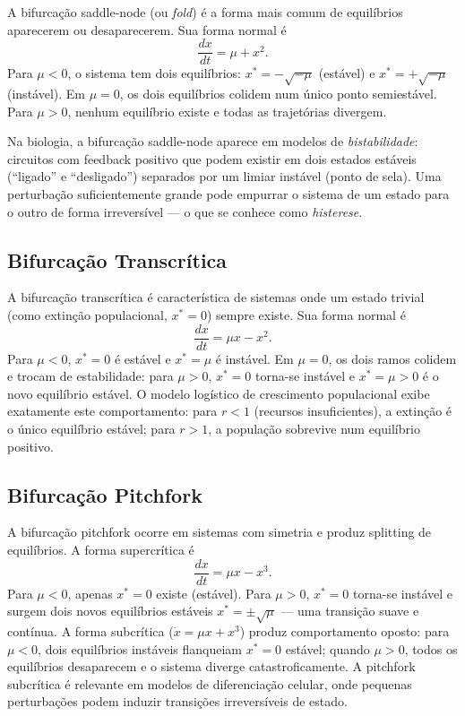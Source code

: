A bifurcação saddle-node (ou \emph{fold}) é a forma mais comum de equilíbrios aparecerem
ou desaparecerem. Sua forma normal é
\begin{equation}
  \frac{dx}{dt} = \mu + x^2.
\end{equation}
Para $\mu < 0$, o sistema tem dois equilíbrios: $x^* = -\sqrt{-\mu}$ (estável) e
$x^* = +\sqrt{-\mu}$ (instável). Em $\mu = 0$, os dois equilíbrios colidem num único ponto
semiestável. Para $\mu > 0$, nenhum equilíbrio existe e todas as trajetórias divergem.

Na biologia, a bifurcação saddle-node aparece em modelos de \emph{bistabilidade}: circuitos
com feedback positivo que podem existir em dois estados estáveis (``ligado'' e ``desligado'')
separados por um limiar instável (ponto de sela). Uma perturbação suficientemente grande
pode empurrar o sistema de um estado para o outro de forma irreversível --- o que se conhece
como \emph{histerese}.

\subsection{Bifurcação Transcrítica}

A bifurcação transcrítica é característica de sistemas onde um estado trivial (como extinção
populacional, $x^* = 0$) sempre existe. Sua forma normal é
\begin{equation}
  \frac{dx}{dt} = \mu x - x^2.
\end{equation}
Para $\mu < 0$, $x^* = 0$ é estável e $x^* = \mu$ é instável. Em $\mu = 0$, os dois
ramos colidem e trocam de estabilidade: para $\mu > 0$, $x^* = 0$ torna-se instável e
$x^* = \mu > 0$ é o novo equilíbrio estável. O modelo logístico de crescimento populacional
exibe exatamente este comportamento: para $r < 1$ (recursos insuficientes), a extinção é o
único equilíbrio estável; para $r > 1$, a população sobrevive num equilíbrio positivo.

\subsection{Bifurcação Pitchfork}

A bifurcação pitchfork ocorre em sistemas com simetria e produz splitting de equilíbrios.
A forma supercrítica é
\begin{equation}
  \frac{dx}{dt} = \mu x - x^3.
\end{equation}
Para $\mu < 0$, apenas $x^* = 0$ existe (estável). Para $\mu > 0$, $x^* = 0$ torna-se
instável e surgem dois novos equilíbrios estáveis $x^* = \pm\sqrt{\mu}$ --- uma transição
suave e contínua. A forma subcrítica ($\dot{x} = \mu x + x^3$) produz comportamento
oposto: para $\mu < 0$, dois equilíbrios instáveis flanqueiam $x^* = 0$ estável; quando
$\mu > 0$, todos os equilíbrios desaparecem e o sistema diverge catastroficamente. A
pitchfork subcrítica é relevante em modelos de diferenciação celular, onde pequenas
perturbações podem induzir transições irreversíveis de estado.


